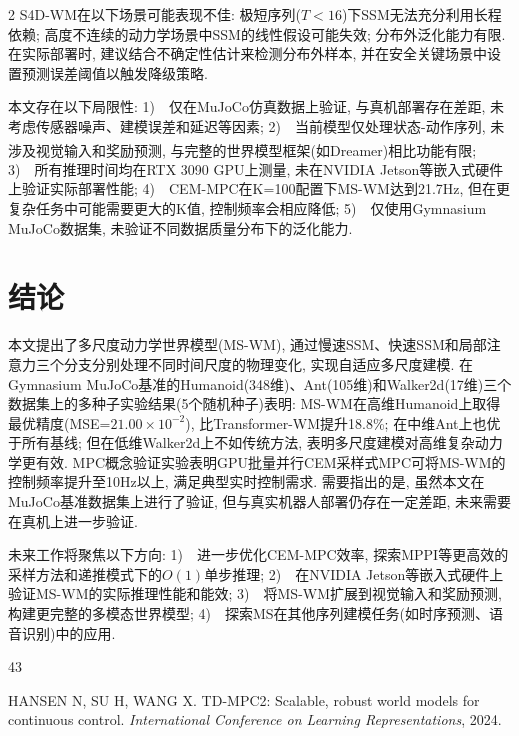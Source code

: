\begin{multicols}{2}
S4D-WM在以下场景可能表现不佳: 极短序列($T<16$)下SSM无法充分利用长程依赖; 高度不连续的动力学场景中SSM的线性假设可能失效; 分布外泛化能力有限.
在实际部署时, 建议结合不确定性估计来检测分布外样本, 并在安全关键场景中设置预测误差阈值以触发降级策略.

本文存在以下局限性:
1)~~仅在MuJoCo仿真数据上验证, 与真机部署存在差距, 未考虑传感器噪声、建模误差和延迟等因素;
2)~~当前模型仅处理状态-动作序列, 未涉及视觉输入和奖励预测, 与完整的世界模型框架(如Dreamer\textsuperscript{\cite{10}})相比功能有限;
3)~~所有推理时间均在RTX 3090 GPU上测量, 未在NVIDIA Jetson等嵌入式硬件上验证实际部署性能;
4)~~CEM-MPC在K=100配置下MS-WM达到21.7Hz, 但在更复杂任务中可能需要更大的K值, 控制频率会相应降低;
5)~~仅使用Gymnasium MuJoCo数据集, 未验证不同数据质量分布下的泛化能力.

\section{结论}

本文提出了多尺度动力学世界模型(MS-WM), 通过慢速SSM、快速SSM和局部注意力三个分支分别处理不同时间尺度的物理变化, 实现自适应多尺度建模.
在Gymnasium MuJoCo基准的Humanoid(348维)、Ant(105维)和Walker2d(17维)三个数据集上的多种子实验结果(5个随机种子)表明:
MS-WM在高维Humanoid上取得最优精度(MSE=$21.00{\times}10^{-2}$), 比Transformer-WM提升18.8\%;
在中维Ant上也优于所有基线;
但在低维Walker2d上不如传统方法, 表明多尺度建模对高维复杂动力学更有效.
MPC概念验证实验表明GPU批量并行CEM采样式MPC可将MS-WM的控制频率提升至10Hz以上, 满足典型实时控制需求.
需要指出的是, 虽然本文在MuJoCo基准数据集上进行了验证, 但与真实机器人部署仍存在一定差距, 未来需要在真机上进一步验证.

未来工作将聚焦以下方向:
1)~~进一步优化CEM-MPC效率, 探索MPPI等更高效的采样方法和递推模式下的$O(1)$单步推理;
2)~~在NVIDIA Jetson等嵌入式硬件上验证MS-WM的实际推理性能和能效;
3)~~将MS-WM扩展到视觉输入和奖励预测, 构建更完整的多模态世界模型;
4)~~探索MS在其他序列建模任务(如时序预测、语音识别)中的应用.

\vskip 12pt
 {\fontsize{7.8pt}{9.4pt}\selectfont
\begin{thebibliography}{43} \vskip 7pt
\setlength{\parskip}{-2pt}

HANSEN N, SU H, WANG X. TD-MPC2: Scalable, robust world models for continuous control. {\it International Conference on Learning Representations}, 2024.


\end{thebibliography}}
\end{multicols}
